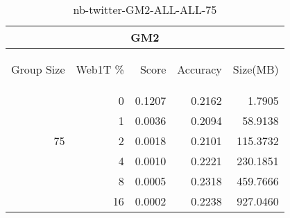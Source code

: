 \begin{center}
\begin{table}[htbp] 
 \begin{center}
\begin{tabular}{ | r | r | r | r | r |}
\hline
\multicolumn{5}{|c|}{GM2}\\
\hline
\begin{sideways}Group Size\end{sideways} & \begin{sideways}Web1T \%\end{sideways} & \begin{sideways}Score\end{sideways} & \begin{sideways}Accuracy\end{sideways} & \begin{sideways}Size(MB)\end{sideways}\\
\hline
\multirow{5}{*}{75}
 & 0 & 0.1207 & 0.2162 & 1.7905\\ \cline{2-5}
 & 1 & 0.0036 & 0.2094 & 58.9138\\ \cline{2-5}
 & 2 & 0.0018 & 0.2101 & 115.3732\\ \cline{2-5}
 & 4 & 0.0010 & 0.2221 & 230.1851\\ \cline{2-5}
 & 8 & 0.0005 & 0.2318 & 459.7666\\ \cline{2-5}
 & 16 & 0.0002 & 0.2238 & 927.0460\\ \cline{2-5}
\hline
\end{tabular}
\caption{nb-twitter-GM2-ALL-ALL-75}
\label{table:nb-twitter-GM2-ALL-ALL-75}
\end{center}
 \end{table}
\end{center}


